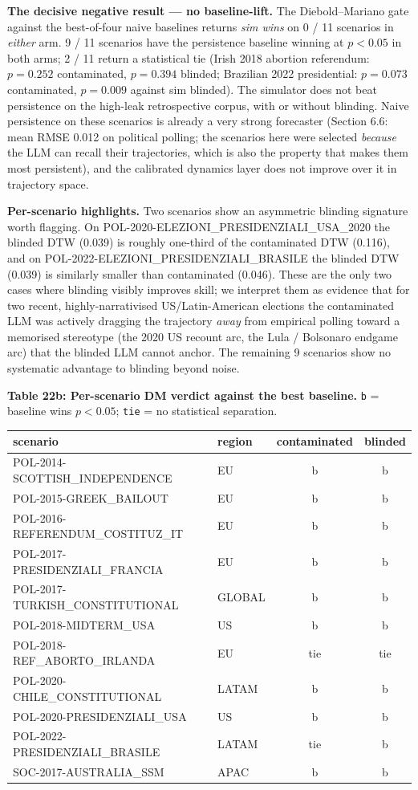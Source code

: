 \documentclass[
]{article}
\begin{document}
\textbf{The decisive negative result --- no baseline-lift.} The
Diebold--Mariano gate against the best-of-four naive baselines returns
\emph{sim wins} on 0 / 11 scenarios in \emph{either} arm. 9 / 11
scenarios have the persistence baseline winning at \(p<0.05\) in both
arms; 2 / 11 return a statistical tie (Irish 2018 abortion referendum:
\(p=0.252\) contaminated, \(p=0.394\) blinded; Brazilian 2022
presidential: \(p=0.073\) contaminated, \(p=0.009\) against sim
blinded). The simulator does not beat persistence on the high-leak
retrospective corpus, with or without blinding. Naive persistence on
these scenarios is already a very strong forecaster (Section 6.6: mean
RMSE 0.012 on political polling; the scenarios here were selected
\emph{because} the LLM can recall their trajectories, which is also the
property that makes them most persistent), and the calibrated dynamics
layer does not improve over it in trajectory space.

\textbf{Per-scenario highlights.} Two scenarios show an asymmetric
blinding signature worth flagging. On
POL-2020-ELEZIONI\_PRESIDENZIALI\_USA\_2020 the blinded DTW (0.039) is
roughly one-third of the contaminated DTW (0.116), and on
POL-2022-ELEZIONI\_PRESIDENZIALI\_BRASILE the blinded DTW (0.039) is
similarly smaller than contaminated (0.046). These are the only two
cases where blinding visibly improves skill; we interpret them as
evidence that for two recent, highly-narrativised US/Latin-American
elections the contaminated LLM was actively dragging the trajectory
\emph{away} from empirical polling toward a memorised stereotype (the
2020 US recount arc, the Lula / Bolsonaro endgame arc) that the blinded
LLM cannot anchor. The remaining 9 scenarios show no systematic
advantage to blinding beyond noise.

\textbf{Table 22b: Per-scenario DM verdict against the best baseline.}
\texttt{b} = baseline wins \(p<0.05\); \texttt{tie} = no statistical
separation.

\begin{longtable}[]{@{}llcc@{}}
\toprule\noalign{}
scenario & region & contaminated & blinded \\
\midrule\noalign{}
\endhead
\bottomrule\noalign{}
\endlastfoot
POL-2014-SCOTTISH\_INDEPENDENCE & EU & b & b \\
POL-2015-GREEK\_BAILOUT & EU & b & b \\
POL-2016-REFERENDUM\_COSTITUZ\_IT & EU & b & b \\
POL-2017-PRESIDENZIALI\_FRANCIA & EU & b & b \\
POL-2017-TURKISH\_CONSTITUTIONAL & GLOBAL & b & b \\
POL-2018-MIDTERM\_USA & US & b & b \\
POL-2018-REF\_ABORTO\_IRLANDA & EU & tie & tie \\
POL-2020-CHILE\_CONSTITUTIONAL & LATAM & b & b \\
POL-2020-PRESIDENZIALI\_USA & US & b & b \\
POL-2022-PRESIDENZIALI\_BRASILE & LATAM & tie & b \\
SOC-2017-AUSTRALIA\_SSM & APAC & b & b \\
\end{longtable}
\end{document}
